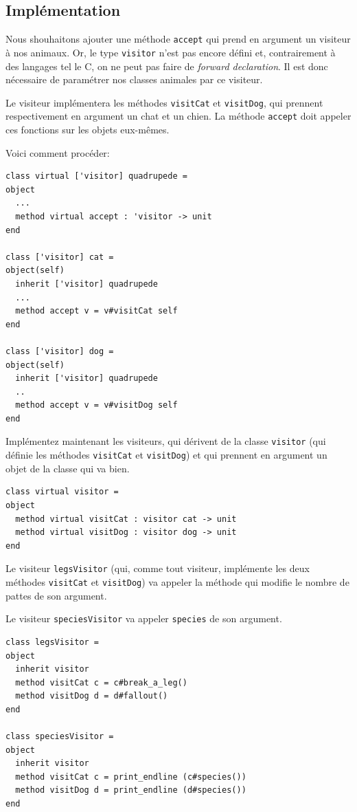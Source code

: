 \documentclass[a4paper]{article}
\begin{document}
\subsection{Implémentation}

Nous shouhaitons ajouter une méthode \verb|accept| qui prend en argument un
visiteur à nos animaux. Or, le type \verb|visitor| n'est pas encore défini et,
contrairement à des langages tel le C, on ne peut pas faire de \textit{forward
declaration}. Il est donc nécessaire de paramétrer nos classes animales par ce
visiteur.

Le visiteur implémentera les méthodes \verb|visitCat| et \verb|visitDog|, qui
prennent respectivement en argument un chat et un chien. La méthode
\verb|accept| doit appeler ces fonctions sur les objets eux-mêmes.

\vspace{3mm}

Voici comment procéder:

\begin{verbatim}
class virtual ['visitor] quadrupede =
object
  ...
  method virtual accept : 'visitor -> unit
end

class ['visitor] cat =
object(self)
  inherit ['visitor] quadrupede
  ...
  method accept v = v#visitCat self
end

class ['visitor] dog =
object(self)
  inherit ['visitor] quadrupede
  ..
  method accept v = v#visitDog self
end
\end{verbatim}

Implémentez maintenant les visiteurs, qui dérivent de la classe \verb|visitor|
(qui définie les méthodes \verb|visitCat| et \verb|visitDog|) et qui prennent
en argument un objet de la classe qui va bien.

\begin{verbatim}
class virtual visitor =
object
  method virtual visitCat : visitor cat -> unit
  method virtual visitDog : visitor dog -> unit
end
\end{verbatim}

Le visiteur \verb|legsVisitor| (qui, comme tout visiteur, implémente les deux
méthodes \verb|visitCat| et \verb|visitDog|) va appeler la méthode qui modifie
le nombre de pattes de son argument.

Le visiteur \verb|speciesVisitor| va appeler \verb|species| de son argument.


\begin{verbatim}
class legsVisitor =
object
  inherit visitor
  method visitCat c = c#break_a_leg()
  method visitDog d = d#fallout()
end

class speciesVisitor =
object
  inherit visitor
  method visitCat c = print_endline (c#species())
  method visitDog d = print_endline (d#species())
end
\end{verbatim}
\end{document}
